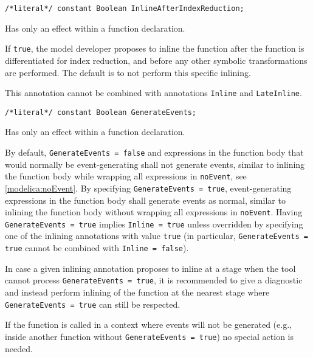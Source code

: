 \begin{annotationdefinition}[InlineAfterIndexReduction]
\begin{synopsis}\begin{lstlisting}
/*literal*/ constant Boolean InlineAfterIndexReduction;
\end{lstlisting}\end{synopsis}
\begin{semantics}
Has only an effect within a function declaration.

If {\lstinline!true!}, the model developer proposes to inline the function after the function is differentiated for index reduction, and before any other symbolic transformations are performed.
The default is to not perform this specific inlining.

This annotation cannot be combined with annotations {\lstinline!Inline!} and {\lstinline!LateInline!}.
\end{semantics}
\end{annotationdefinition}

\begin{annotationdefinition}[GenerateEvents]
\begin{synopsis}\begin{lstlisting}
/*literal*/ constant Boolean GenerateEvents;
\end{lstlisting}\end{synopsis}
\begin{semantics}
Has only an effect within a function declaration.

By default, {\lstinline!GenerateEvents = false!} and expressions in the function body that would normally be event-generating shall not generate events, similar to inlining the function body while wrapping all expressions in {\lstinline!noEvent!}, see \cref{modelica:noEvent}.
By specifying {\lstinline!GenerateEvents = true!}, event-generating expressions in the function body shall generate events as normal, similar to inlining the function body without wrapping all expressions in {\lstinline!noEvent!}.
Having {\lstinline!GenerateEvents = true!} implies {\lstinline!Inline = true!} unless overridden by specifying one of the inlining annotations with value {\lstinline!true!} (in particular, {\lstinline!GenerateEvents = true!} cannot be combined with {\lstinline!Inline = false!}).

\begin{nonnormative}
In case a given inlining annotation proposes to inline at a stage when the tool cannot process {\lstinline!GenerateEvents = true!}, it is recommended to give a diagnostic and instead perform inlining of the function at the nearest stage where {\lstinline!GenerateEvents = true!} can still be respected.

If the function is called in a context where events will not be generated (e.g., inside another function without {\lstinline!GenerateEvents = true!}) no special action is needed.
\end{nonnormative}
\end{semantics}
\end{annotationdefinition}



